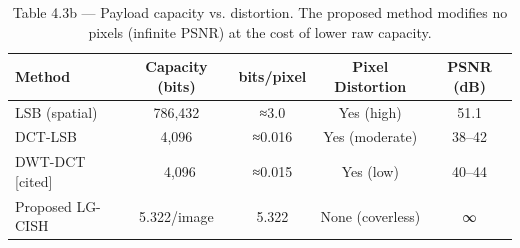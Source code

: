 \begin{table}[htbp]
\centering
\caption{Table 4.3b — Payload capacity vs. distortion. The proposed method modifies no pixels (infinite PSNR) at the cost of lower raw capacity.}
\label{tab:table_4_3_capacity}
\begin{tabular}{lcccc}
\hline
Method & Capacity (bits) & bits/pixel & Pixel Distortion & PSNR (dB) \\
\hline
LSB (spatial) & 786,432 & ≈3.0 & Yes (high) & 51.1 \\
DCT-LSB & 4,096 & ≈0.016 & Yes (moderate) & 38–42 \\
DWT-DCT [cited] & ~4,096 & ≈0.015 & Yes (low) & 40–44 \\
Proposed LG-CISH & 5.322/image & 5.322 & None (coverless) & ∞ \\
\hline
\end{tabular}
\end{table}
